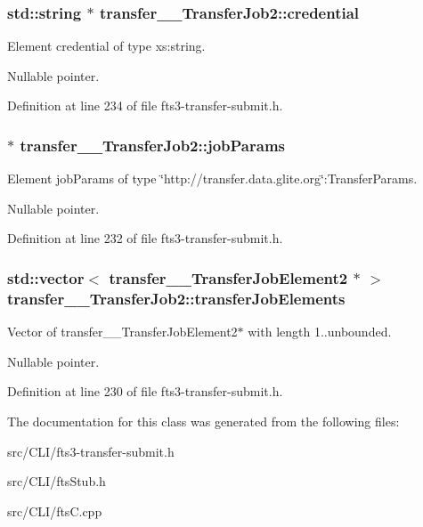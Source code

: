 \subsubsection[{credential}]{\setlength{\rightskip}{0pt plus 5cm}std::string $\ast$ {\bf transfer\_\-\_\-TransferJob2::credential}}\label{classtransfer____TransferJob2_ada735715456be6ed04899f941cc9b11a}


Element credential of type xs:string. 

Nullable pointer. 

Definition at line 234 of file fts3-\/transfer-\/submit.h.

\subsubsection[{jobParams}]{ $\ast$ {\bf transfer\_\-\_\-TransferJob2::jobParams}}\label{classtransfer____TransferJob2_a4897231653618589fd9362969298a494}


Element jobParams of type \char`\"{}http://transfer.data.glite.org\char`\"{}:TransferParams. 

Nullable pointer. 

Definition at line 232 of file fts3-\/transfer-\/submit.h.

\subsubsection[{transferJobElements}]{\setlength{\rightskip}{0pt plus 5cm}std::vector$<$ {\bf transfer\_\-\_\-TransferJobElement2} $\ast$ $>$ {\bf transfer\_\-\_\-TransferJob2::transferJobElements}}\label{classtransfer____TransferJob2_a092c850c457a62e8850699d72b810104}


Vector of transfer\_\-\_\-TransferJobElement2$\ast$ with length 1..unbounded. 

Nullable pointer. 

Definition at line 230 of file fts3-\/transfer-\/submit.h.



The documentation for this class was generated from the following files:\begin{DoxyCompactItemize}
\item 
src/CLI/fts3-\/transfer-\/submit.h\item 
src/CLI/ftsStub.h\item 
src/CLI/ftsC.cpp\end{DoxyCompactItemize}
